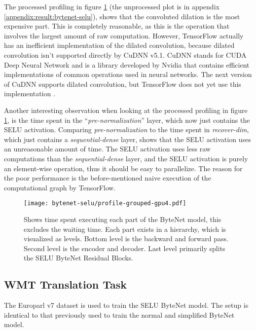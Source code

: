 The processed profiling in figure \ref{fig:result:selu-bytenet:profile-grouped} (the unprocessed plot is in appendix \ref{appendix:result:bytenet-selu}), shows that the convoluted dilation is the most expensive part. This is completely reasonable, as this is the operation that involves the largest amount of raw computation. However, TensorFlow actually has an inefficient implementation of the dilated convolution, because dilated convolution isn't supported directly by CuDNN v5.1. CuDNN stands for CUDA Deep Neural Network and is a library developed by Nvidia that contains efficient implementations of common operations used in neural networks. The next version of CuDNN supports dilated convolution, but TensorFlow does not yet use this implementation \cite{nvidia-cudnn}.

Another interesting observation when looking at the processed profiling in figure \ref{fig:result:selu-bytenet:profile-grouped}, is the time spent in the ``\textit{pre-normalization}'' layer, which now just contains the SELU activation. Comparing \textit{pre-normalization} to the time spent in \textit{recover-dim}, which just contains a \textit{sequential-dense} layer, shows that the SELU activation uses an unreasonable amount of time. The SELU activation uses less raw computations than the \textit{sequential-dense} layer, and the SELU activation is purely an element-wise operation, thus it should be easy to parallelize. The reason for the poor performance is the before-mentioned naive execution of the computational graph by TensorFlow.

\begin{figure}[h]
    \centering
    \texttt{[image: bytenet-selu/profile-grouped-gpu4.pdf]}
    \caption{Shows time spent executing each part of the ByteNet model, this excludes the waiting time. Each part exists in a hierarchy, which is visualized as levels. Bottom level is the backward and forward pass. Second level is the encoder and decoder. Last level primarily splits the SELU ByteNet Residual Blocks.}
    \label{fig:result:selu-bytenet:profile-grouped}
\end{figure}

\clearpage
\subsection{WMT Translation Task}

The Europarl v7 dataset is used to train the SELU ByteNet model. The setup is identical to that previously used to train the normal and simplified ByteNet model.

